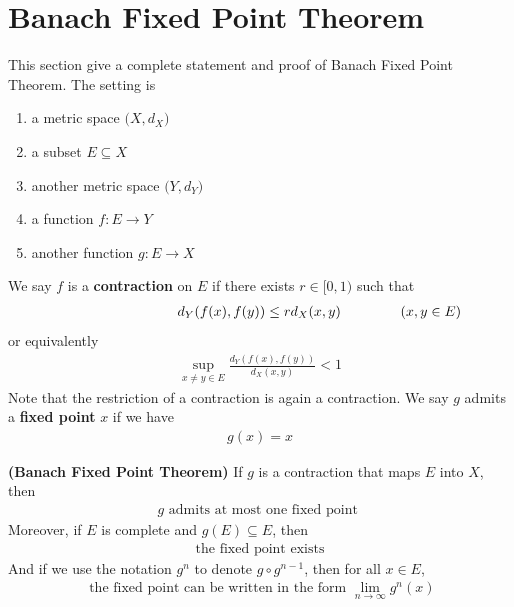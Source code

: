 \documentclass{report}
\begin{document}
\section{Banach Fixed Point Theorem}
\begin{mdframed}
This section give a complete statement and proof of Banach Fixed Point Theorem. The setting is 
\begin{enumerate}[label=(\alph*)]
  \item a metric space $\Big(X,d_X \Big)$ 
  \item a subset $E\subseteq X$
  \item another metric space $\Big(Y,d_Y \Big)$ 
  \item a function $f:E\rightarrow Y$ 
  \item another function $g:E\rightarrow X$
\end{enumerate}
We say $f$ is a \textbf{contraction} on $E$ if there exists $r\in [0,1)$ such that 
\begin{align*}
\hspace{3cm}d_Y(f(x),f(y))\leq rd_X(x,y)\hspace{1.5cm}(x,y \in E)
\end{align*}
or equivalently 
\begin{align*}
\sup_{x\neq y \in E} \frac{d_Y(f(x),f(y))}{d_X(x,y)}<1
\end{align*}
Note that the restriction of a contraction is again a contraction. We say $g$ admits a \textbf{fixed point} $x$ if we have 
\begin{align*}
g(x)=x
\end{align*}
\end{mdframed}
\begin{theorem}
\label{BFPT}
\textbf{(Banach Fixed Point Theorem)} If $g$ is a contraction that maps $E$ into $X$, then 
\begin{align*}
g\text{ admits at most one fixed point }
\end{align*}
Moreover, if $E$ is complete and $g(E)\subseteq E$, then 
\begin{align*}
\text{ the fixed point exists }
\end{align*}
And if we use the notation $g^n$ to denote $g\circ g^{n-1}$, then for all $x\in E$,  
\begin{align*}
  \text{ the fixed point can be written in the form }\lim_{n\to \infty}g^n(x)
\end{align*}
\end{theorem}
\end{document}
